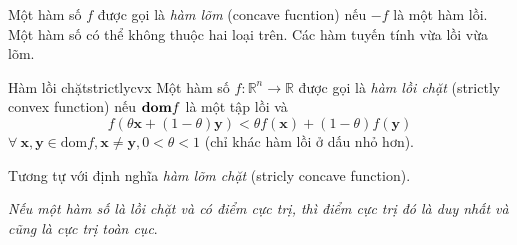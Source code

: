 
Một hàm số $f$ được gọi là \textit{hàm lõm} (concave fucntion) nếu $-f$
là một hàm lồi. Một
hàm số có thể không thuộc hai loại trên. Các hàm tuyến tính vừa lồi vừa lõm.
\begin{mydef}{Hàm lồi chặt}{strictlycvx}
Một hàm số $f: \mathbb{R}^n \rightarrow \mathbb{R} $ được gọi là
\textit{hàm lồi chặt} ({strictly convex function}) nếu $\boldsymbol{\mathbf{dom}} f$ là một
{tập lồi} và
\begin{equation*}
f(\theta\mathbf{x} + (1 - \theta) \mathbf{y}) < \theta f(\mathbf{x}) + (1 - \theta)f(\mathbf{y})
\end{equation*}
$\forall~\mathbf{x, y} \in \text{dom}f, \mathbf{x} \neq \mathbf{y},  0 < \theta
< 1$ (chỉ khác hàm lồi ở dấu nhỏ hơn).

\end{mydef}

Tương tự với định nghĩa \textit{hàm lõm chặt} (stricly concave function).

\textit{Nếu một hàm số là \textit{lồi chặt} và có điểm cực trị, thì điểm cực trị đó là duy nhất và cũng là cực trị toàn cục}.



